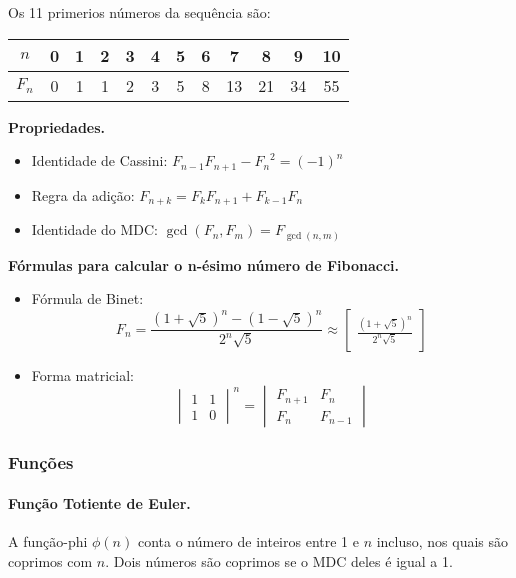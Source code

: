 Os 11 primerios números da sequência são:
\begin{center}
    \begin{tabular}{c|c c c c c c c c c c c}
        $n$ & 0 &1&2&3&4&5&6&7&8&9&10\\
        \hline
        $F_n$&0&1&1&2&3&5&8&13&21&34&55
    \end{tabular}
    
\end{center}

\textbf{Propriedades.}
\begin{itemize}
    \item Identidade de Cassini: $F_{n-1}F_{n+1}-{F_n}^2 = (-1)^n$
    \item Regra da adição: $F_{n+k} = F_kF_{n+1}+F_{k-1}F_n$
    \item Identidade do MDC: $\gcd(F_n,F_m)=F_{\gcd(n,m)}$
\end{itemize}

\textbf{Fórmulas para calcular o n-ésimo número de Fibonacci.}

\begin{itemize}
    \item Fórmula de Binet:
    $$F_n = \frac{(1+\sqrt{5})^n - (1-\sqrt{5})^n}{2^n\sqrt{5}} 
    \approx \begin{bmatrix} 
                \frac{(1+\sqrt{5})^n}{2^n\sqrt{5}}
            \end{bmatrix}$$
    \item Forma matricial: 
    $$\begin{vmatrix}
        1 & 1 \\
        1 & 0
    \end{vmatrix}^n 
    = 
    \begin{vmatrix}
       F_{n+1} & F_{n} \\
       F_{n} & F_{n-1} 
    \end{vmatrix}$$
\end{itemize}

\subsubsection{Funções}
\paragraph{Função Totiente de Euler.} A função-phi $\phi(n)$ conta o número de inteiros entre 1 e $n$ incluso, nos quais são coprimos com $n$. Dois números são coprimos se o MDC deles é igual a 1.

